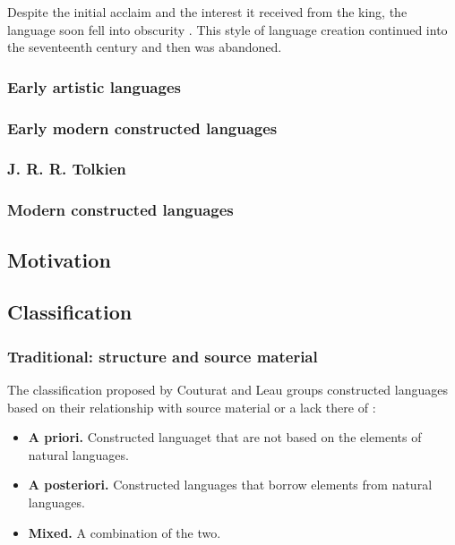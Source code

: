 \documentclass[14pt, a4paper]{extreport}
\begin{document}
Despite the initial acclaim and the interest it received from the king, the language soon fell into obscurity \parencite[25]{okrent}. This style of language creation continued into the seventeenth century and then was abandoned.

\subsubsection{Early artistic languages}

\subsubsection{Early modern constructed languages}

\subsubsection{J. R. R. Tolkien}

\subsubsection{Modern constructed languages}

\subsection{Motivation}


\subsection{Classification}

\subsubsection{Traditional: structure and source material}
The classification proposed by Couturat and Leau groups constructed languages based on their relationship with source material or a lack there of \parencite{couturat}:

\begin{itemize}
  \item \textbf{A priori.} Constructed languaget that are not based on the elements of natural languages.
  \item \textbf{A posteriori.} Constructed languages that borrow elements from natural languages.
  \item \textbf{Mixed.} A combination of the two.
\end{itemize}
\end{document}
